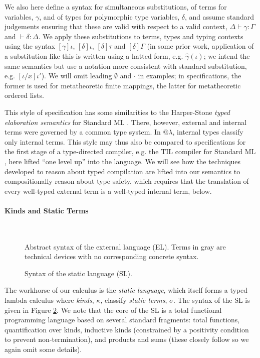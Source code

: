 \documentclass[9pt,preprint]{sigplanconf}
\begin{document}
We also here define a syntax for simultaneous substitutions, of terms for variables, $\gamma$, and of types for polymorphic type variables, $\delta$, and assume standard judgements ensuring that these are valid with respect to a valid context, $\Delta \vdash \gamma : \Gamma$ and $\vdash \delta : \Delta$. We apply these substitutions to terms, types and typing contexts using the syntax $[\gamma]\iota$, $[\delta]\iota$, $[\delta]\tau$ and $[\delta]\Gamma$ (in some prior work, application of a substitution like this is written using a hatted form, e.g. $\hat\gamma(\iota)$; we intend the same semantics but use a notation more consistent with standard substitution, e.g. $[\iota/x]\iota'$). We will omit  leading $\emptyset$ and $\cdot$ in examples; in specifications, the former is used for  metatheoretic finite mappings, the latter for metatheoretic ordered lists.

This style of specification has some  similarities to the Harper-Stone \emph{typed elaboration semantics} for Standard ML \cite{Harper00atype-theoretic}. There, however, external and internal terms were governed by a common type system. In @$\lambda$, {internal types} classify only internal terms. 
This style may thus also be compared to specifications for the first stage of a type-directed compiler, e.g. the TIL compiler for Standard ML \cite{tarditi+:til-OLD}, here lifted ``one level up'' into the language. We will see how the techniques developed to reason about typed compilation are lifted into our semantics to compositionally reason about type safety, which requires that the translation of every well-typed external term is a well-typed internal term, below.


\paragraph{Kinds and Static Terms}
\begin{figure}[t!]
\small
\hspace{-5px}\\
\caption{Abstract syntax of the external language (EL). Terms in gray are technical devices with no corresponding concrete syntax.}
\label{syntax-EL}
\end{figure}
\begin{figure}[t!]
\small
\hspace{-4px}
\caption{Syntax of the static language (SL).}
\label{syntax-SL}
\end{figure}
The workhorse of our calculus is the \emph{static language}, which itself forms a typed lambda calculus where 
\emph{kinds}, $\kappa$, classify \emph{static terms}, $\sigma$.  The syntax of the SL is given in Figure \ref{syntax-SL}. We note that the core of the SL is a total functional programming language based on several standard fragments: total functions, quantification over kinds, inductive kinds (constrained by a positivity condition to prevent non-termination), and products and sums (these closely follow \cite{pfpl} so we again omit some details). 
\end{document}
